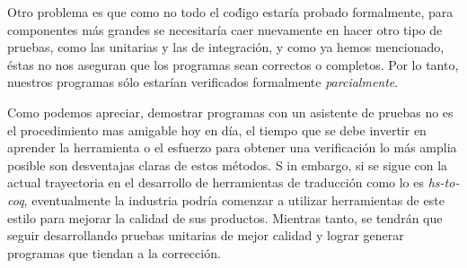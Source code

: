 Otro problema es que como no todo el co\'digo estaría probado formalmente, para componentes m\'as 
grandes se necesitaría caer nuevamente en hacer otro tipo de pruebas, como las unitarias y las de integración, y como ya 
hemos mencionado, \'estas no nos aseguran que los programas sean correctos o completos. Por lo tanto, 
nuestros programas s\'olo estarían verificados formalmente \textit{parcialmente}.

Como podemos apreciar, demostrar programas con un asistente de pruebas no es el procedimiento mas 
amigable hoy en día, el tiempo que se debe invertir en aprender la herramienta o el esfuerzo para 
obtener una verificación lo más amplia posible son desventajas claras de estos métodos. S
in embargo, si se sigue con la actual trayectoria en el desarrollo de 
herramientas de traducci\'on como lo es \textit{hs-to-coq}, eventualmente la industria podría 
comenzar a utilizar herramientas de este estilo para mejorar la calidad de sus productos. 
Mientras tanto, se tendrán que seguir desarrollando pruebas unitarias de mejor calidad y lograr generar 
programas que tiendan a la correcci\'on.
